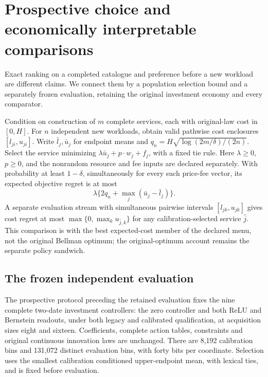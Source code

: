 \section{Prospective choice and economically interpretable comparisons}\label{sec:prospective86}
Exact ranking on a completed catalogue and preference before a new workload are different claims. We connect them by a population selection bound and a separately frozen evaluation, retaining the original investment economy and every comparator.

\begin{proposition}\label{prop:selection86}
Condition on construction of $m$ complete services, each with original-law cost in $[0,H]$. For $n$ independent new workloads, obtain valid pathwise cost enclosures $[l_{ji},u_{ji}]$. Write $\bar l_j,\bar u_j$ for endpoint means and $q_n=H\sqrt{\log(2m/\delta)/(2n)}$. Select the service minimizing $\lambda\bar u_j+p\cdot w_j+f_j$, with a fixed tie rule. Here $\lambda\ge0$, $p\ge0$, and the nonrandom resource and fee inputs are declared separately. With probability at least $1-\delta$, simultaneously for every such price-fee vector, its expected objective regret is at most
\[
 \lambda\{2q_n+\max_j(\bar u_j-\bar l_j)\}.
\]
A separate evaluation stream with simultaneous pairwise intervals $[l_{jk},u_{jk}]$ gives cost regret at most $\max\{0,\max_k u_{\widehat j,k}\}$ for any calibration-selected service $\widehat j$. This comparison is with the best expected-cost member of the declared menu, not the original Bellman optimum; the original-optimum account remains the separate policy sandwich.
\end{proposition}

\subsection{The frozen independent evaluation}
The prospective protocol preceding the retained evaluation fixes the nine complete two-date investment controllers: the zero controller and both ReLU and Bernstein readouts, under both legacy and calibrated qualification, at acquisition sizes eight and sixteen. Coefficients, complete action tables, constraints and original continuous innovation laws are unchanged. There are 8,192 calibration bins and 131,072 distinct evaluation bins, with forty bits per coordinate. Selection uses the smallest calibration conditioned upper-endpoint mean, with lexical ties, and is fixed before evaluation.


